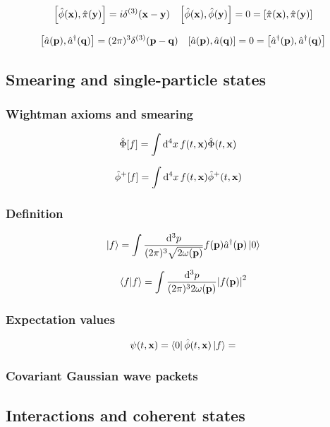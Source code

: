 \begin{align}
	\comm{\hat\phi(\vb{x})}{\hat\pi(\vb{y})}
	=
	i\delta^{(3)}(\vb{x}-\vb{y})
	&&
	\comm{\hat\phi(\vb{x})}{\hat\phi(\vb{y})}
	=
	0
	=
	\comm{\hat\pi(\vb{x})}{\hat\pi(\vb{y})}
	\label{eq:kg_comm_pm}	
\end{align}

\begin{align}
	\comm{\hat{a}(\vb{p})}{\hat{a}^\dagger(\vb{q})}
	=
	(2\pi)^3\delta^{(3)}(\vb{p}-\vb{q})
	&&
	\comm{\hat{a}(\vb{p})}{\hat{a}(\vb{q})}
	=
	0
	=
	\comm{\hat{a}^\dagger(\vb{p})}{\hat{a}^\dagger(\vb{q})}
	\label{eq:kg_comm_ac}
\end{align}

\subsection{Smearing and single-particle states}

\subsubsection{Wightman axioms and smearing}

\begin{align}
	\hat\Phi[f]
	&=
	\int\dd[4]{x}f(t,\vb{x})\hat\Phi(t,\vb{x})
\end{align}

\begin{align}
	\hat\phi^+[f]
	&=
	\int\dd[4]{x}
	f(t,\vb{x})
	\hat\phi^+(t,\vb{x})
\end{align}

\subsubsection{Definition}

\begin{equation}
	\ket{f}
	=
	\int\frac{\dd[3]{p}}{(2\pi)^3\sqrt{2\omega(\vb{p})}}
	f(\vb{p})\hat{a}^\dagger(\vb{p})\ket{0}
\end{equation}

\begin{equation}
	\bra{f}\ket{f}
	=
	\int\frac{\dd[3]{p}}{(2\pi)^32\omega(\vb{p})}
	\abs{f(\vb{p})}^2
\end{equation}

\subsubsection{Expectation values}

\begin{equation}
	\psi(t,\vb{x})
	=
	\bra{0}\hat\phi(t,\vb{x})\ket{f}
	=
\end{equation}

\subsubsection{Covariant Gaussian wave packets}

\subsection{Interactions and coherent states}
